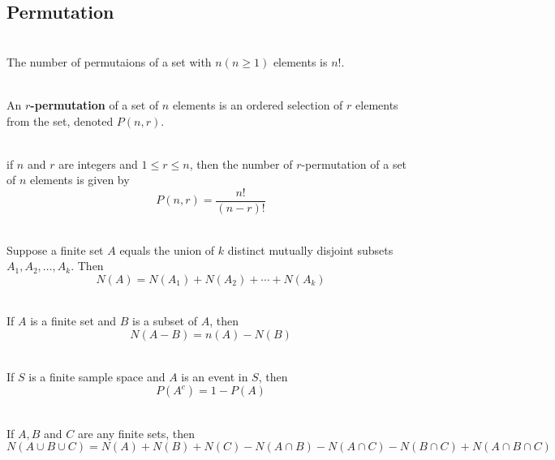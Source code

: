 \documentclass[12pt]{article}
\begin{document}
\subsection{Permutation}
\begin{theorem}[Permutation(9.2.2)]
\hfill\\
\normalfont The number of permutaions of a set with $n (n\geq 1)$ elements is $n!$.
\end{theorem}
\begin{definition}[$r$-permutation]
\hfill\\
\normalfont An \textbf{$r$-permutation} of a set of $n$ elements is an ordered selection of $r$ elements from the set, denoted $P(n,r)$.
\end{definition}
\begin{theorem}[9.2.3]
\hfill\\
\normalfont if $n$ and $r$ are integers and $1\leq r\leq n$, then the number of $r$-permutation of a set of $n$ elements is given by
\[
P(n,r)=\frac{n!}{(n-r)!}
\]
\end{theorem}
\begin{theorem}
\hfill\\
\normalfont Suppose a finite set $A$ equals the union of $k$ distinct mutually disjoint subsets $A_1, A_2,\ldots,A_k$. Then
\[
N(A)=N(A_1)+N(A_2)+\cdots+N(A_k)
\]
\end{theorem}
\begin{theorem}
\hfill\\
\normalfont If $A$ is a finite set and $B$ is a subset of $A$, then
\[
N(A-B)=n(A)-N(B)
\]
\end{theorem}
\begin{theorem}
\hfill\\
\normalfont If $S$ is a finite sample space and $A$ is an event in $S$, then 
\[
P(A^c)=1-P(A)
\]
\end{theorem}
\begin{theorem}
\hfill\\
\normalfont If $A, B$ and $C$ are any finite sets, then
\[
N(A\cup B\cup C)= N(A)+N(B)+N(C)-N(A\cap B)-N(A\cap C)-N(B\cap C)+N(A\cap B\cap C)
\]
\end{theorem}
\end{document}
